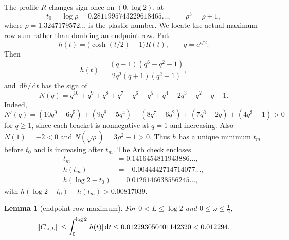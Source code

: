 \documentclass[11pt,a4paper]{article}
\newcommand{\dd}{\,\mathrm d}
\DeclarePairedDelimiter{\abs}{\lvert}{\rvert}
\DeclarePairedDelimiter{\norm}{\lVert}{\rVert}
\theoremstyle{plain}
\newtheorem{lemma}[theorem]{Lemma}
\theoremstyle{definition}
\numberwithin{equation}{section}
\begin{document}
The profile $R$ changes sign once on $(0,\log2)$, at
\begin{equation}
t_0=\log\rho=0.2811995743229618465\ldots,\qquad\rho^3=\rho+1,
\end{equation}
where $\rho=1.3247179572\ldots$ is the plastic number. We locate the actual
maximum row sum rather than doubling an endpoint row. Put
\begin{equation}
h(t)=\bigl(\cosh(t/2)-1\bigr)R(t),\qquad q=e^{t/2}.
\end{equation}
Then
\begin{equation}
h(t)=\frac{(q-1)(q^6-q^2-1)}{2q^2(q+1)(q^2+1)},
\end{equation}
and $\dd h/\dd t$ has the sign of
\begin{equation}
N(q)=q^{10}+q^9+q^8+q^7-q^6-q^5+q^4-2q^3-q^2-q-1 .
\end{equation}
Indeed,
\begin{equation}
N'(q)=(10q^9-6q^5)+(9q^8-5q^4)+(8q^7-6q^2)+(7q^6-2q)+(4q^3-1)>0
\end{equation}
for $q\ge1$, since each bracket is nonnegative at $q=1$ and increasing. Also
$N(1)=-2<0$ and $N(\sqrt\rho)=3\rho^2-1>0$. Thus $h$ has a unique minimum
$t_m$ before $t_0$ and is increasing after $t_m$. The Arb check encloses
\begin{equation}
\begin{aligned}
t_m&=0.1416454811943886\ldots,\\
h(t_m)&=-0.0044442714714077\ldots,\\
h(\log2-t_0)&=0.0126146638556245\ldots,
\end{aligned}
\end{equation}
with $h(\log2-t_0)+h(t_m)>0.00817039$.

\begin{lemma}[endpoint row maximum]\label{lem:row-max}
For $0<L\le\log2$ and $0\le\omega\le\tfrac12$,
\begin{equation}\label{eq:C-norm}
\norm{C_{\omega,L}}\le\int_0^{\log2}\abs{h(t)}\dd t
\le0.012293050401142320<0.012294 .
\end{equation}
\end{lemma}
\end{document}
